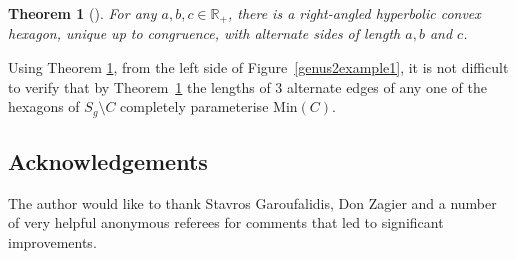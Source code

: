 \documentclass[pdftex]{sigma}
\numberwithin{equation}{section}
\newtheorem{Theorem}{Theorem}[section]
\begin{document}
\begin{Theorem}[{\cite[Theorem 3.5.14]{Ratcliffe}}]
\label{Rat}
For any $a,b,c \in \mathbb{R}_{+}$, there is a right-angled hyperbolic convex hexagon, unique up to congruence, with alternate sides of length $a,b$ and $c$.
\end{Theorem}

Using Theorem \ref{Rat}, from the left side of Figure~\ref{genus2example1}, it is not difficult to verify that by Theorem~\ref{Rat} the lengths of 3 alternate edges of any one of the hexagons of $S_{g}\setminus C$ completely parameterise $\mathrm{Min}(C)$.

\subsection*{Acknowledgements}
The author would like to thank Stavros Garoufalidis, Don Zagier and a number of very helpful anonymous referees for comments that led to significant improvements.
\end{document}
